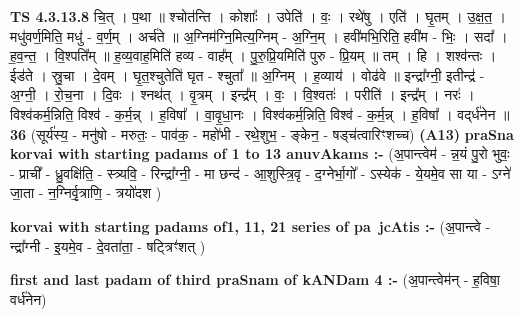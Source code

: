 \documentclass[17pt]{extarticle}
\begin{document}
                  \newline
                                \textbf{ TS 4.3.13.8} \newline
                  चि॒त् । प॒था ॥ श्चोत॑न्ति । कोशाः᳚ । उपेति॑ । वः॒ । रथे॑षु । एति॑ । घृ॒तम् । उ॒क्ष॒त॒ । मधु॑वर्ण॒मिति॒ मधु॑ - व॒र्ण॒म् । अर्च॑ते ॥ अ॒ग्निम॑ग्नि॒मित्य॒ग्निम् - अ॒ग्नि॒म् । हवी॑मभि॒रिति॒ हवी॑म - भिः॒ । सदा᳚ । ह॒व॒न्त॒ । वि॒श्पति᳚म् ॥ ह॒व्य॒वाह॒मिति॑ हव्य - वाह᳚म् । पु॒रु॒प्रि॒यमिति॑ पुरु - प्रि॒यम् ॥ तम् । हि । शश्व॑न्तः । ईड॑ते । स्रु॒चा । दे॒वम् । घृ॒त॒श्चुतेति॑ घृत - श्चुता᳚ ॥ अ॒ग्निम् । ह॒व्याय॑ । वोढ॑वे ॥ इन्द्रा᳚ग्नी॒ इतीन्द्र॑ - अ॒ग्नी॒ । रो॒च॒ना । दि॒वः । श्नथ॑त् । वृ॒त्रम् । इन्द्र᳚म् । वः॒ । वि॒श्वतः॑ । परीति॑ । इन्द्र᳚म् । नरः॑ । विश्व॑कर्म॒न्निति॒ विश्व॑ - क॒र्म॒न्न् । ह॒विषा᳚ । वा॒वृ॒धा॒नः । विश्व॑कर्म॒न्निति॒ विश्व॑ - क॒र्म॒न्न् । ह॒विषा᳚ । वद्‌र्ध॑नेन ॥ \textbf{  36 } \newline
                  \newline
                      (सूर्य॑स्य॒ - मनु॑षो - मरुतः॒ - पाव॑क॒ - महो॑भी - रथे॒शुभ॒ - ङ्केन॒ - षड्च॑त्वारिꣳशच्च)  \textbf{(A13)} \newline \newline
\textbf{praSna korvai with starting padams of 1 to 13 anuvAkams :-} \newline
(अ॒पान्त्वेम॑ - न्न॒यं पु॒रो भुवः॒ - प्राची᳚ - ध्रु॒वक्षि॑ति॒ - स्त्र्यवि॒ - रिन्द्रा᳚ग्नी॒ - मा छन्द॑ - आ॒शुस्त्रि॒वृ - द॒ग्नेर्भा॒गो᳚ - ऽस्येक॑ - ये॒यमे॒व सा या - ऽग्ने॑ जा॒ता - न॒ग्निर्वृ॒त्राणि॒ - त्रयो॑दश ) \newline

\textbf{korvai with starting padams of1, 11, 21 series of pa~jcAtis :-} \newline
(अ॒पान्त्वे - न्द्रा᳚ग्नी - इ॒यमे॒व - दे॒वता॑ता॒ - षट्त्रिꣳ॑शत् ) \newline

\textbf{first and last padam of third praSnam of kANDam 4 :-} \newline
(अ॒पान्त्वेम॑न् - ह॒विषा॒ वर्ध॑नेन) \newline 
\end{document}
